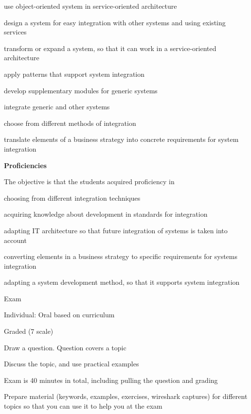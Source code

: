 \documentclass[Screen16to9,17pt]{foils}
\begin{document}
\begin{list2}
\item use object-oriented system in service-oriented architecture
\item design a system for easy integration with other systems and using existing services
\item transform or expand a system, so that it can work in a service-oriented architecture
\item apply patterns that support system integration
\item develop supplementary modules for generic systems
\item integrate generic and other systems
\item choose from different methods of integration
\item translate elements of a business strategy into concrete requirements for system integration
\end{list2}


{\bf Proficiencies}

The objective is that the students acquired proficiency in

\begin{list2}
\item choosing from different integration techniques
\item acquiring knowledge about development in standards for integration
\item adapting IT architecture so that future integration of systems is taken into account
\item converting elements in a business strategy to specific requirements for systems integration
\item adapting a system development method, so that it supports system integration
\end{list2}





\begin{list2}
\item Exam
\item Individual: Oral based on curriculum
\item Graded (7 scale)
\item Draw a question. Question covers a topic
\item Discuss the topic, and use practical examples
\item Exam is 40 minutes in total, including pulling the question and grading
\item Prepare material (keywords, examples, exercises, wireshark captures) for different topics so that you can use it to help you at the exam

\end{list2}
\end{document}
